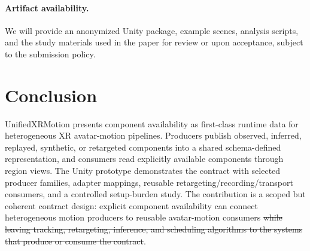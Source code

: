 \documentclass[runningheads]{llncs}
\newcommand{\rdel}[1]{\textcolor{revdel}{\sout{#1}}}
\newcommand{\rdel}[1]{}
\begin{document}
\paragraph{Artifact availability.}
We will provide an anonymized Unity package, example scenes, analysis scripts, and the study materials used in the paper for review or upon acceptance, subject to the submission policy.

\section{Conclusion}\label{sec:conclusion}
UnifiedXRMotion presents component availability as first-class runtime data for heterogeneous XR avatar-motion pipelines. Producers publish observed, inferred, replayed, synthetic, or retargeted components into a shared schema-defined representation, and consumers read explicitly available components through region views. The Unity prototype demonstrates the contract with selected producer families, adapter mappings, reusable retargeting/recording/transport consumers, and a controlled setup-burden study. The contribution is a scoped but coherent contract design: explicit component availability can connect heterogeneous motion producers to reusable avatar-motion consumers\rdel{ while leaving tracking, retargeting, inference, and scheduling algorithms to the systems that produce or consume the contract}.



\end{document}
